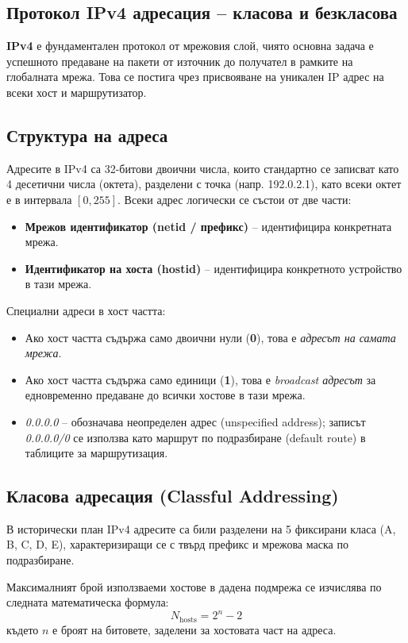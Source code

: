 \documentclass{scrartcl}
\begin{document}
\begin{FlushLeft}
\section{Протокол IPv4 адресация – класова и безкласова}

\textbf{IPv4} е фундаментален протокол от мрежовия слой, чиято основна задача е успешното предаване на пакети от източник до получател в рамките на глобалната мрежа. Това се постига чрез присвояване на уникален IP адрес на всеки хост и маршрутизатор.

\subsection{Структура на адреса}
Адресите в IPv4 са 32-битови двоични числа, които стандартно се записват като 4 десетични числа (октета), разделени с точка (напр. 192.0.2.1), като всеки октет е в интервала $[0, 255]$. Всеки адрес логически се състои от две части:
\begin{itemize}
    \item \textbf{Мрежов идентификатор (netid / префикс)} – идентифицира конкретната мрежа.
    \item \textbf{Идентификатор на хоста (hostid)} – идентифицира конкретното устройство в тази мрежа.
\end{itemize}

Специални адреси в хост частта:
\begin{itemize}
    \item Ако хост частта съдържа само двоични нули (\textbf{0}), това е \textit{адресът на самата мрежа}.
    \item Ако хост частта съдържа само единици (\textbf{1}), това е \textit{broadcast адресът} за едновременно предаване до всички хостове в тази мрежа.
    \item \textit{0.0.0.0} – обозначава неопределен адрес (unspecified address); записът \textit{0.0.0.0/0} се използва като маршрут по подразбиране (default route) в таблиците за маршрутизация.
\end{itemize}

\subsection{Класова адресация (Classful Addressing)}
В исторически план IPv4 адресите са били разделени на 5 фиксирани класа (A, B, C, D, E), характеризиращи се с твърд префикс и мрежова маска по подразбиране. 

Максималният брой използваеми хостове в дадена подмрежа се изчислява по следната математическа формула:
\begin{equation}
N_{\text{hosts}} = 2^{n} - 2
\end{equation}
където $n$ е броят на битовете, заделени за хостовата част на адреса.


\end{FlushLeft}
\end{document}
